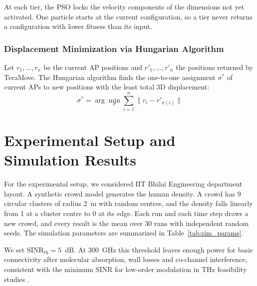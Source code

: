 \documentclass[conference]{IEEEtran}
\begin{document}
	At each tier, the PSO locks the velocity components of the dimensions not yet activated. One particle starts at the current configuration, so a tier never returns a configuration with lower fitness than its input.

	\subsubsection{Displacement Minimization via Hungarian Algorithm}

	Let $r_1, \ldots, r_n$ be the current AP positions and $r'_1, \ldots, r'_n$ the positions returned by TeraMove. The Hungarian algorithm \cite{b12} finds the one-to-one assignment $\sigma^*$ of current APs to new positions with the least total 3D displacement:
	\begin{equation}
		\sigma^* = \arg\min_{\sigma} \sum_{i=1}^{n} \|r_i - r'_{\sigma(i)}\|
		\label{eq:hungarian}
	\end{equation}

	\section{Experimental Setup and Simulation Results}

	For the experimental setup, we considered IIT Bhilai Engineering department layout. A synthetic crowd model generates the human density. A crowd has 9 circular clusters of radius 2~m with random centres, and the density falls linearly from 1 at a cluster centre to 0 at its edge. Each run and each time step draws a new crowd, and every result is the mean over 30 runs with independent random seeds. The simulation parameters are summarized in Table~\ref{tab:sim_params}.

	We set $\text{SINR}_{\text{th}} = 5$~dB. At 300~GHz this threshold leaves enough power for basic connectivity after molecular absorption, wall losses and co-channel interference, consistent with the minimum SINR for low-order modulation in THz feasibility studies \cite{b5}.
\end{document}
